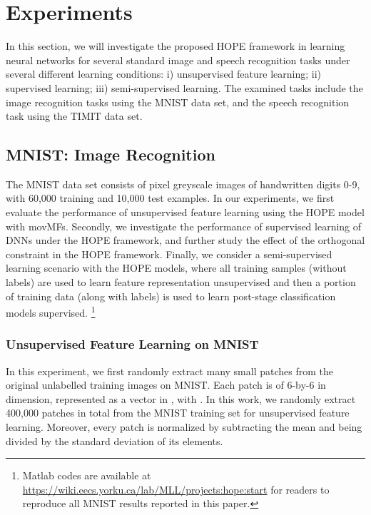 \documentclass[11pt]{article}
\begin{document}
\section{Experiments}

In this section, we will investigate the proposed HOPE framework in learning neural networks for several standard image and speech recognition tasks under several different learning conditions: i) unsupervised feature learning;  ii) supervised learning; iii) semi-supervised learning. The examined tasks include the image recognition tasks using the MNIST data set, and the speech recognition task using the TIMIT data set. 


\subsection{MNIST: Image Recognition}
\label{exp-MNIST}

The MNIST data set \cite{lecun1998gradient} consists of  pixel greyscale images of handwritten digits 0-9, with 60,000 training and 10,000 test examples. In our experiments, 
we first evaluate the performance of unsupervised feature learning using the  HOPE model with movMFs.
Secondly, we investigate the performance of supervised learning of DNNs under the HOPE framework, and further study the effect of the orthogonal constraint in the HOPE framework. Finally, 
we consider a semi-supervised learning scenario with the HOPE models, where all training samples (without labels) are used to learn feature representation unsupervised and then a portion of training data (along with labels) is used to learn post-stage classification models supervised. \footnote{Matlab codes are available at \url{https://wiki.eecs.yorku.ca/lab/MLL/projects:hope:start} for readers to reproduce all MNIST results reported in this paper.} 

\subsubsection{Unsupervised Feature Learning on MNIST}
\label{exp-MNIST-unsupervised-features}

In this experiment, we first randomly extract many small patches from the original unlabelled training images on MNIST. Each patch is of 6-by-6 in dimension, represented as a vector in , with . In this work, we randomly extract 
400,000 patches in total from the MNIST training set for unsupervised feature learning. 
Moreover,  every patch is normalized by subtracting the mean and being  divided by the standard deviation of its elements.  
 
\end{document}

